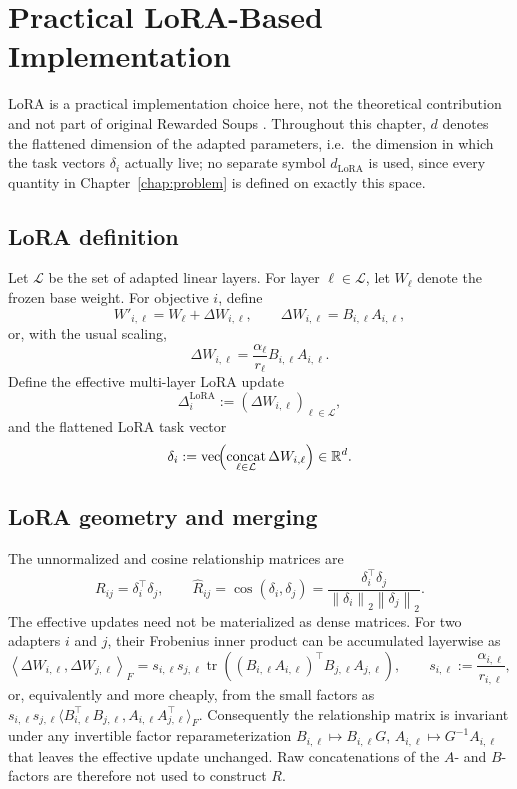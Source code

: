 \documentclass[12pt,a4paper]{report}
\newcommand{\R}{\mathbb{R}}
\newcommand{\1}{\mathbf{1}}
\newcommand{\norm}[1]{\left\lVert #1 \right\rVert}
\DeclareMathOperator{\vecop}{vec}
\DeclareMathOperator{\concat}{concat}
\DeclareMathOperator{\tr}{tr}
\theoremstyle{definition}
\begin{document}
\chapter{Practical LoRA-Based Implementation}
\label{chap:lora}

LoRA is a practical implementation choice here, not the theoretical contribution and not part of original Rewarded Soups \citep{hu2021lora}. Throughout this chapter, \(d\) denotes the flattened dimension of the adapted parameters, i.e.\ the dimension in which the task vectors \(\delta_i\) actually live; no separate symbol \(d_{\mathrm{LoRA}}\) is used, since every quantity in Chapter~\ref{chap:problem} is defined on exactly this space.

\section{LoRA definition}

Let \(\mathcal{L}\) be the set of adapted linear layers. For layer \(\ell\in\mathcal{L}\), let \(W_\ell\) denote the frozen base weight. For objective \(i\), define
\[
W'_{i,\ell}=W_\ell+\Delta W_{i,\ell},
\qquad
\Delta W_{i,\ell}=B_{i,\ell}A_{i,\ell},
\]
or, with the usual scaling,
\[
\Delta W_{i,\ell}=\frac{\alpha_\ell}{r_\ell}B_{i,\ell}A_{i,\ell}.
\]
Define the effective multi-layer LoRA update
\[
\Delta_i^{\mathrm{LoRA}}:=(\Delta W_{i,\ell})_{\ell\in\mathcal{L}},
\]
and the flattened LoRA task vector
\[
\delta_i:=\vecop\!\Bigl(\concat_{\ell\in\mathcal{L}}\Delta W_{i,\ell}\Bigr)\in\R^{d}.
\]

\section{LoRA geometry and merging}

The unnormalized and cosine relationship matrices are
\[
R_{ij}=\delta_i^\top\delta_j,
\qquad
\hat R_{ij}=\cos(\delta_i,\delta_j)=\frac{\delta_i^\top\delta_j}{\norm{\delta_i}_2\norm{\delta_j}_2}.
\]
The effective updates need not be materialized as dense matrices. For two adapters \(i\) and \(j\), their Frobenius inner product can be accumulated layerwise as
\[
\left\langle\Delta W_{i,\ell},\Delta W_{j,\ell}\right\rangle_F
=s_{i,\ell}s_{j,\ell}\tr\!\left((B_{i,\ell}A_{i,\ell})^\top B_{j,\ell}A_{j,\ell}\right),
\qquad
s_{i,\ell}:=\frac{\alpha_{i,\ell}}{r_{i,\ell}},
\]
or, equivalently and more cheaply, from the small factors as \(s_{i,\ell}s_{j,\ell}\langle B_{i,\ell}^\top B_{j,\ell},A_{i,\ell}A_{j,\ell}^\top\rangle_F\). Consequently the relationship matrix is invariant under any invertible factor reparameterization \(B_{i,\ell}\mapsto B_{i,\ell}G\), \(A_{i,\ell}\mapsto G^{-1}A_{i,\ell}\) that leaves the effective update unchanged. Raw concatenations of the \(A\)- and \(B\)-factors are therefore not used to construct \(R\).
\end{document}
